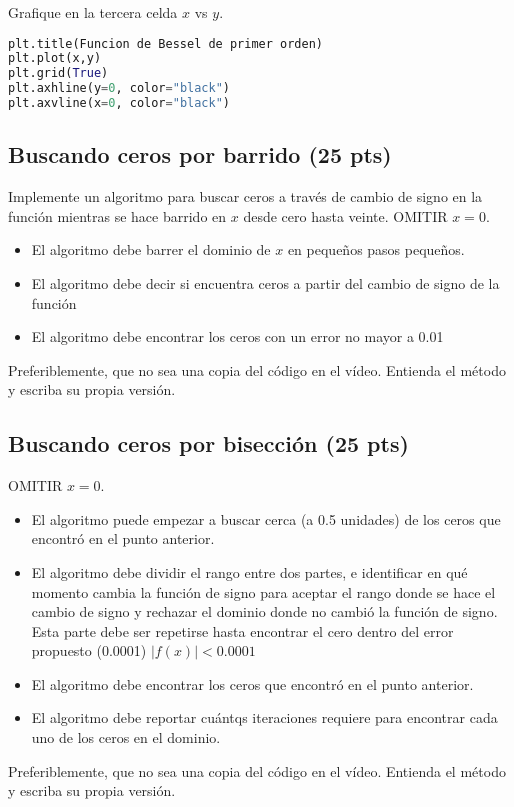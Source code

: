 \documentclass{article}
\begin{document}
Grafique en la tercera celda $x$ vs $y$.
\begin{lstlisting}[language=Python]
plt.title(Funcion de Bessel de primer orden)
plt.plot(x,y)
plt.grid(True)
plt.axhline(y=0, color="black")
plt.axvline(x=0, color="black")
\end{lstlisting}

\subsection{Buscando ceros por barrido (25 pts)}
Implemente un algoritmo para buscar ceros a través de cambio de signo
en la función mientras se hace barrido en $x$ desde cero hasta veinte.
OMITIR $x=0$.

\begin{itemize}
\item El algoritmo debe barrer el dominio de $x$ en pequeños pasos pequeños.
\item El algoritmo debe decir si encuentra ceros a partir del cambio de
  signo de la función
\item El algoritmo debe encontrar los ceros con un error no mayor a 0.01
\end{itemize}
Preferiblemente, que no sea una copia del código en el vídeo. Entienda
el método y escriba su propia versión.

\subsection{Buscando ceros por bisección (25 pts)}
OMITIR $x=0$.
\begin{itemize}
\item El algoritmo puede empezar a buscar cerca (a 0.5 unidades) de los
  ceros que encontró en el punto anterior.
\item El algoritmo debe dividir el rango entre dos partes, e identificar
  en qué momento cambia la función de signo para aceptar el rango
  donde se hace el cambio de signo y rechazar el dominio donde no
  cambió la función de signo. Esta parte debe ser repetirse hasta
  encontrar el cero dentro del error propuesto (0.0001)
  $|f(x)| < 0.0001$
\item El algoritmo debe encontrar los ceros que encontró en el punto
  anterior.
\item El algoritmo debe reportar cuántqs iteraciones requiere para
  encontrar cada uno de los ceros en el dominio.
\end{itemize}
Preferiblemente, que no sea una copia del código en el vídeo. Entienda
el método y escriba su propia versión.
\end{document}

